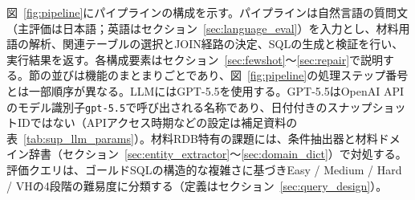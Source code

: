 \documentclass[twocolumn]{interact}
\begin{document}
図~\ref{fig:pipeline}にパイプラインの構成を示す。パイプラインは自然言語の質問文（主評価は日本語；英語はセクション~\ref{sec:language_eval}）を入力とし、材料用語の解析、関連テーブルの選択とJOIN経路の決定、SQLの生成と検証を行い、実行結果を返す。各構成要素はセクション~\ref{sec:fewshot}～\ref{sec:repair}で説明する。節の並びは機能のまとまりごとであり、図~\ref{fig:pipeline}の処理ステップ番号とは一部順序が異なる。LLMにはGPT-5.5を使用する。GPT-5.5はOpenAI APIのモデル識別子\texttt{gpt-5.5}で呼び出される名称であり、日付付きのスナップショットIDではない（APIアクセス時期などの設定は補足資料の表~\ref{tab:sup_llm_params}）。材料RDB特有の課題には、条件抽出器と材料ドメイン辞書（セクション~\ref{sec:entity_extractor}～\ref{sec:domain_dict}）で対処する。評価クエリは、ゴールドSQLの構造的な複雑さに基づきEasy / Medium / Hard / VHの4段階の難易度に分類する（定義はセクション~\ref{sec:query_design}）。
\end{document}
